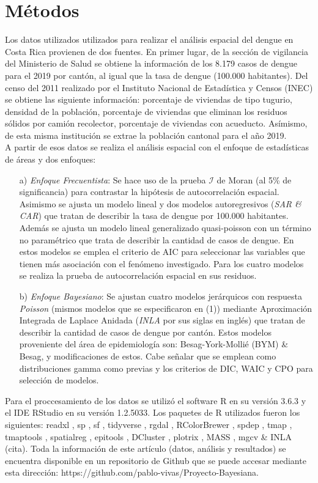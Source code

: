 \documentclass[a4paper,12pt]{report}
\begin{document}
\section*{Métodos}
Los datos utilizados utilizados para realizar el análisis espacial del dengue en Costa Rica provienen de dos fuentes. En primer lugar, de la sección de vigilancia del Ministerio de Salud se obtiene la información de los 8.179 casos de dengue para el 2019 por cantón, al igual que la tasa de dengue (100.000 habitantes). Del censo del 2011 realizado por el Instituto Nacional de Estadística y Censos (INEC) se obtiene las siguiente información: porcentaje de viviendas de tipo tugurio, densidad de la población, porcentaje de viviendas que eliminan los residuos sólidos por camión recolector, porcentaje de viviendas con acueducto. Asímismo, de esta misma institución se extrae la población cantonal para el año 2019.\\
A partir de esos datos se realiza el análisis espacial con el enfoque de estadísticas de áreas y dos enfoques:
\begin{enumerate}
\item[a)] \textit{Enfoque Frecuentista}: Se hace uso de la prueba $\mathcal{I}$ de Moran (al 5\% de significancia) para contrastar la hipótesis de autocorrelación espacial. Asimismo se ajusta un modelo lineal y dos modelos autoregresivos (\textit{SAR \& CAR}) que tratan de describir la tasa de dengue por 100.000 habitantes. Además se ajusta un modelo lineal generalizado quasi-poisson con un término no paramétrico que trata de describir la cantidad de casos de dengue. En estos modelos se emplea el criterio de AIC para seleccionar las variables que tienen más asociación con el fenómeno investigado. Para los cuatro modelos se realiza la prueba de autocorrelación espacial en sus residuos.
\item [b)] \textit{Enfoque Bayesiano}: Se ajustan cuatro modelos jerárquicos con respuesta \textit{Poisson} (mismos modelos que se especificaron en (1)) mediante Aproximación Integrada de Laplace Anidada (\textit{INLA} por sus siglas en inglés) que tratan de describir la cantidad de casos de dengue por cantón. Estos modelos proveniente del área de epidemiología son:  Besag-York-Mollié (BYM) \& Besag, y modificaciones de estos. Cabe señalar que se emplean como distribuciones gamma como previas y los criterios de DIC, WAIC y CPO para selección de modelos.
\end{enumerate}
Para el proccesamiento de los datos se utilizó el software R \cite{R} en su versión 3.6.3 y el IDE RStudio en su versión 1.2.5033. Los paquetes de R utilizados fueron los siguientes: readxl \cite{readxl}, sp \cite{sp}, sf \cite{sf}, tidyverse \cite{tidy}, rgdal \cite{rdal}, RColorBrewer \cite{Rcolor}, spdep \cite{sp}, tmap \cite{tmap}, tmaptools \cite{tmaptools}, spatialreg \cite{sp}, epitools \cite{epitools}, DCluster \cite{dcluster}, plotrix \cite{plotrix}, MASS \cite{MASS},  mgcv \cite{mgcv} \& INLA (cita). Toda la información de este artículo (datos, análisis y resultados) se encuentra disponible en un repositorio de Github que se puede accesar mediante esta dirección: https://github.com/pablo-vivas/Proyecto-Bayesiana.
\end{document}
